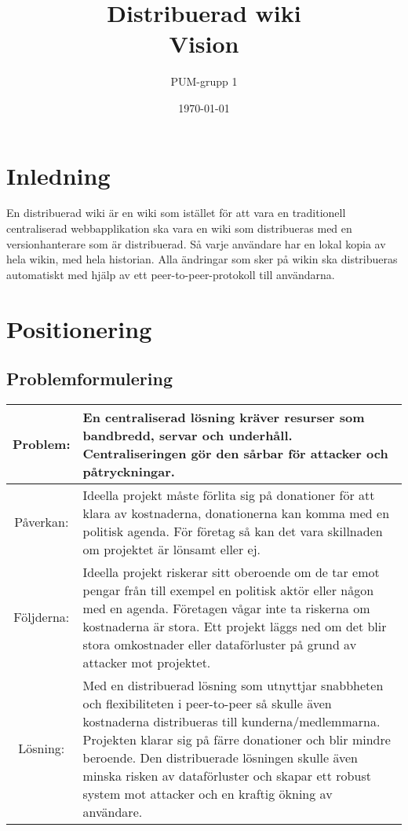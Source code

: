 

\ifpdf
\else
\fi

\title{Distribuerad wiki \\ Vision}
\author{PUM-grupp 1}
\date{\today}



\maketitle

\thispagestyle{empty}
\newpage
\section{Inledning}
En distribuerad wiki är en wiki som istället för att vara en traditionell centraliserad webbapplikation ska vara en wiki som distribueras med en versionhanterare som är distribuerad. Så varje användare har en lokal kopia av hela wikin, med hela historian. Alla ändringar som sker på wikin ska distribueras automatiskt med hjälp av ett peer-to-peer-protokoll till användarna.
\section{Positionering}

\subsection{Problemformulering}
\begin{tabular}{|c|m{15 cm}|}
\hline
Problem: & En centraliserad lösning kräver resurser som bandbredd, servar och underhåll. Centraliseringen gör den sårbar för attacker och påtryckningar. \\
\hline
Påverkan: & Ideella projekt måste förlita sig på donationer för att klara av kostnaderna, donationerna kan komma med en politisk agenda. För företag så kan det vara skillnaden om projektet är lönsamt eller ej.   \\
\hline
Följderna: & Ideella projekt riskerar sitt oberoende om de tar emot pengar från till exempel en politisk aktör eller någon med en agenda. Företagen vågar inte ta riskerna om kostnaderna är stora. Ett projekt läggs ned om det blir stora omkostnader eller dataförluster på grund av attacker mot projektet. \\
\hline
Lösning: & Med en distribuerad lösning som utnyttjar snabbheten och flexibiliteten i peer-to-peer så skulle även kostnaderna distribueras till kunderna/medlemmarna. Projekten klarar sig på färre donationer och blir mindre beroende. Den distribuerade lösningen skulle även minska risken av dataförluster och skapar ett robust system mot attacker och en kraftig ökning av användare. \\
\hline
\end{tabular}


